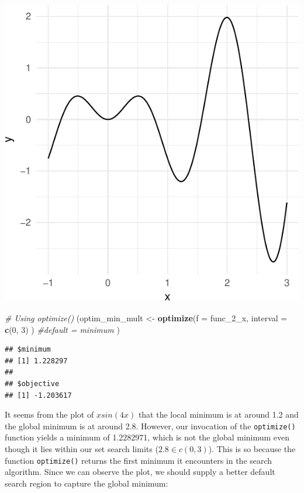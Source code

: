 \documentclass[11pt,]{article}
\newenvironment{Shaded}{\begin{snugshade}}{\end{snugshade}}
\newcommand{\KeywordTok}[1]{\textcolor[rgb]{0.13,0.29,0.53}{\textbf{#1}}}
\newcommand{\DataTypeTok}[1]{\textcolor[rgb]{0.13,0.29,0.53}{#1}}
\newcommand{\DecValTok}[1]{\textcolor[rgb]{0.00,0.00,0.81}{#1}}
\newcommand{\StringTok}[1]{\textcolor[rgb]{0.31,0.60,0.02}{#1}}
\newcommand{\CommentTok}[1]{\textcolor[rgb]{0.56,0.35,0.01}{\textit{#1}}}
\newcommand{\NormalTok}[1]{#1}
\begin{document}
\includegraphics{Optimization_files/figure-latex/opt_unconstr_optimize-2.pdf}

\begin{Shaded}
\begin{Highlighting}[]
\CommentTok{# Using optimize()}
\NormalTok{(optim_min_mult <-}\StringTok{ }\KeywordTok{optimize}\NormalTok{(}\DataTypeTok{f =}\NormalTok{ func_2_x, }
                            \DataTypeTok{interval =} \KeywordTok{c}\NormalTok{(}\DecValTok{0}\NormalTok{, }\DecValTok{3}\NormalTok{)}
\NormalTok{                            ) }\CommentTok{#default = minimum}
\NormalTok{) }
\end{Highlighting}
\end{Shaded}

\begin{verbatim}
## $minimum
## [1] 1.228297
## 
## $objective
## [1] -1.203617
\end{verbatim}

It seems from the plot of \(xsin(4x)\) that the local minimum is at
around 1.2 and the global minimum is at around 2.8. However, our
invocation of the \texttt{optimize()} function yields a minimum of
1.2282971, which is not the global minimum even though it lies within
our set search limits (\(2.8\in c(0,3)\)). This is so because the
function \texttt{optimize()} returns the first minimum it encounters in
the search algorithm. Since we can observe the plot, we should supply a
better default search region to capture the global minimum:
\end{document}
